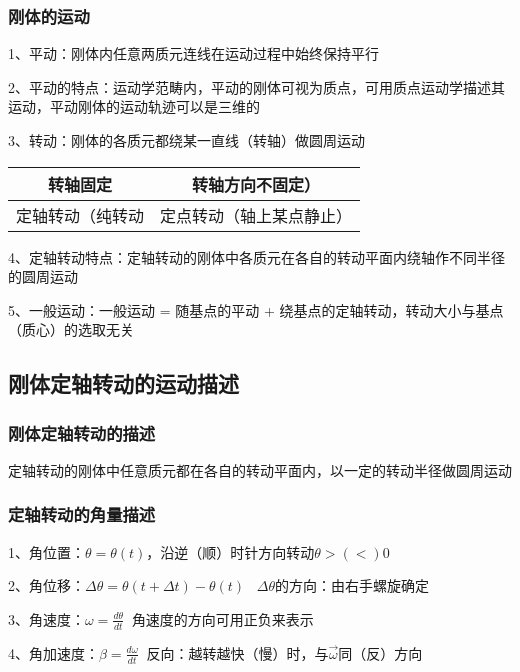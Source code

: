 \documentclass[UTF8]{article}
\begin{document}
\subsubsection{刚体的运动}

    1、平动：刚体内任意两质元连线在运动过程中始终保持平行

    2、平动的特点：运动学范畴内，平动的刚体可视为质点，可用质点运动学描述其运动，平动刚体的运动轨迹可以是三维的

    3、转动：刚体的各质元都绕某一直线（转轴）做圆周运动

    \begin{tabular}{|c|c|}%
        \hline  %
        转轴固定&转轴方向不固定）\\
        \hline  %
        定轴转动（纯转动&定点转动（轴上某点静止）\\
        \hline %
    \end{tabular}

    4、定轴转动特点：定轴转动的刚体中各质元在各自的转动平面内绕轴作不同半径的圆周运动

    5、一般运动：一般运动 = 随基点的平动 + 绕基点的定轴转动，转动大小与基点（质心）的选取无关

\subsection{刚体定轴转动的运动描述}
\subsubsection{刚体定轴转动的描述}

    定轴转动的刚体中任意质元都在各自的转动平面内，以一定的转动半径做圆周运动

\subsubsection{定轴转动的角量描述}

    1、角位置：$\theta = \theta (t)$，沿逆（顺）时针方向转动\;\;\;$\theta >(<) 0$

    2、角位移：$\Delta\theta = \theta(t + \Delta t) - \theta(t)\;\;\;\Delta\theta$的方向：由右手螺旋确定

    3、角速度：$\omega = \frac{d\theta}{dt}\;\;$角速度的方向可用正负来表示

    4、角加速度：$\beta = \frac{d\omega}{dt}\;\;$反向：越转越快（慢）时，与$\vec{\omega}$同（反）方向
\end{document}

